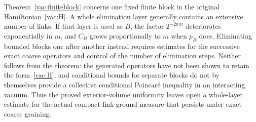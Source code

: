 Theorem~\ref{vac:finiteblock} concerns one fixed finite block in the original
Hamiltonian~\eqref{vac:H}.  A whole elimination layer generally contains an
extensive number of links.  If that layer is used as $B$, the factor
$2^{-2mn}$ deteriorates exponentially in $m$, and $C_B$ grows proportionally
to $m$ when $p_B$ does.  Eliminating bounded blocks one after another instead
requires estimates for the successive exact coarse operators and control of
the number of elimination steps.  Neither follows from the theorem: the
generated operators have not been shown to retain the form~\eqref{vac:H},
and conditional bounds for separate blocks do not by themselves provide a
collective conditional Poincar\'e inequality in an interacting vacuum.
Thus the proved exterior-volume uniformity leaves open a whole-layer
estimate for the actual compact-link ground measure that persists under
exact coarse graining.
